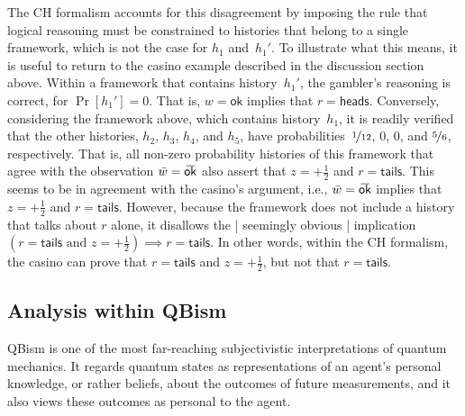 \documentclass[12pt]{article}
\theoremstyle{mystyle}
\theoremstyle{definition}
\newcommand{\oline}[2]{{\mkern#2mu\overline{\protect\vphantom{t}\mkern-#2mu\smash{#1}\mkern-#2mu}\mkern#2mu}}
\newcommand*{\ket}[1]{{| #1 \rangle}}
\newcommand{\proj}[1]{|#1\rangle\!\langle #1|}
\newcommand*{\wb}{\bar{w}}
\newcommand*{\splus}{{\textstyle + \frac{1}{2}}}
\newcommand*{\ok}{\mathsf{ok}}
\newcommand*{\okb}{\oline{\ok}{2.8}}
\newcommand*{\head}{\mathsf{heads}}
\newcommand*{\tail}{\mathsf{tails}}
\begin{document}

The CH formalism accounts for this disagreement by imposing the rule that logical reasoning must be constrained to histories that belong to a single framework, which is not the case for $h_1$ and~$h_1'$.  To illustrate what this means, it is useful to return to the  casino example described in  the discussion section above.  Within a framework that contains history~$h_1'$, the gambler's reasoning is correct, for $\Pr[h_1'] = 0$.  That is, $w= \ok$ implies that $r=\head$. Conversely, considering the framework above, which contains history~$h_1$, it is readily verified that the other histories, $h_2$, $h_3$, $h_4$, and $h_5$, have probabilities~$\nicefrac{1}{12}$, $0$, $0$, and $\nicefrac{5}{6}$, respectively. That is, all non-zero probability histories of this framework that agree with the observation $\wb=\okb$ also assert that $z = \splus$ and $r = \tail$. This seems to be in agreement with the casino's argument, i.e.,  $\wb = \okb$ implies that $z = \splus$ and $r = \tail$. However,  because the framework does not include a history that talks about $r$ alone, it disallows the | seemingly obvious | implication  $( r = \tail \text{ and } z = \splus ) \implies r = \tail$. In other words, within the CH formalism, the casino can prove that $r = \tail$ and $z = \splus$, but not that $r=\tail$. 

\subsection{Analysis within QBism} \label{app_QBism}

QBism is one of the most far-reaching subjectivistic interpretations of quantum mechanics.  It regards quantum states as representations of an agent's  personal knowledge, or rather beliefs, about the outcomes of future measurements, and it also views these outcomes as personal to the agent. 
\end{document}
